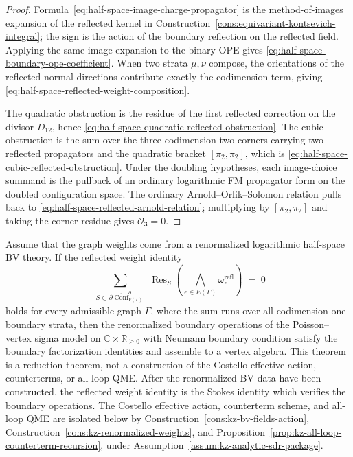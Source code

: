 \begin{proof}
Formula~\eqref{eq:half-space-image-charge-propagator} is the
method-of-images expansion of the reflected kernel in
Construction~\ref{cons:equivariant-kontsevich-integral}; the sign is
the action of the boundary reflection on the reflected field. Applying
the same image expansion to the binary OPE gives
\eqref{eq:half-space-boundary-ope-coefficient}. When two strata
\(\mu,\nu\) compose, the orientations of the reflected normal directions
contribute exactly the codimension term, giving
\eqref{eq:half-space-reflected-weight-composition}.

The quadratic obstruction is the residue of the first reflected
correction on the divisor \(D_{12}\), hence
\eqref{eq:half-space-quadratic-reflected-obstruction}. The cubic
obstruction is the sum over the three codimension-two corners carrying
two reflected propagators and the quadratic bracket \([\pi_2,\pi_2]\),
which is \eqref{eq:half-space-cubic-reflected-obstruction}. Under the
doubling hypotheses, each image-choice summand is the pullback of an
ordinary logarithmic FM propagator form on the doubled configuration
space. The ordinary Arnold--Orlik--Solomon relation pulls back to
\eqref{eq:half-space-reflected-arnold-relation}; multiplying by
\([\pi_2,\pi_2]\) and taking the corner residue gives
\(\mathcal O_3=0\).
\end{proof}

\begin{theorem}%
\label{thm:half-space-reduction}
Assume that the graph weights come from a renormalized logarithmic
half-space BV theory. If the reflected weight identity
\begin{equation}\label{eq:reflected-weight-identity}
\sum_{\substack{S \subset
\partial\overline{\operatorname{Conf}}^{\partial}_{V(\Gamma)}}} \!\!
\operatorname{Res}_S\!\left(
\bigwedge_{e\in E(\Gamma)} \omega_e^{\mathrm{refl}}\right)
\;=\; 0
\end{equation}
holds for every admissible graph $\Gamma$, where the sum runs over all codimension-one boundary strata, then
the renormalized boundary operations of the Poisson--vertex
sigma model on $\mathbb C\times\mathbb R_{\ge 0}$ with Neumann
boundary condition satisfy the boundary factorization identities and
assemble to a vertex algebra.
This theorem is a reduction theorem, not a construction of the
Costello effective action, counterterms, or all-loop QME. After the
renormalized BV data have been constructed, the reflected weight
identity is the Stokes identity which verifies the boundary operations.
The Costello effective action,
counterterm scheme, and all-loop QME are isolated below by
Construction~\ref{cons:kz-bv-fields-action},
Construction~\ref{cons:kz-renormalized-weights}, and
Proposition~\ref{prop:kz-all-loop-counterterm-recursion}, under
Assumption~\ref{assum:kz-analytic-sdr-package}.
\end{theorem}

